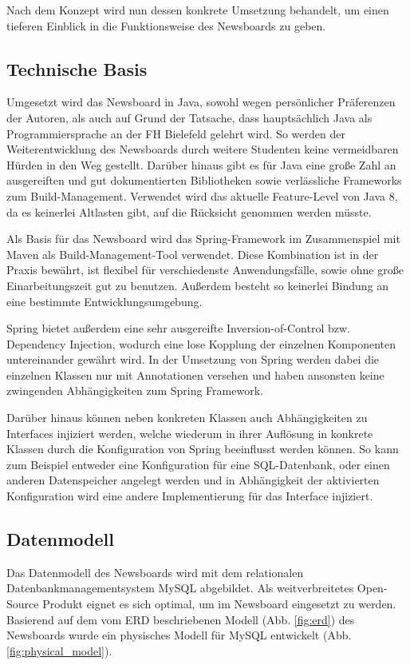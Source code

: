 Nach dem Konzept wird nun dessen konkrete Umsetzung behandelt,
um einen tieferen Einblick in die Funktionsweise des Newsboards zu geben.

\subsection{Technische Basis}
Umgesetzt wird das Newsboard in Java, sowohl wegen persönlicher Präferenzen der Autoren,
als auch auf Grund der Tatsache, dass hauptsächlich Java als Programmiersprache
an der FH Bielefeld gelehrt wird. So werden der Weiterentwicklung des Newsboards
durch weitere Studenten keine vermeidbaren Hürden in den Weg gestellt.
Darüber hinaus gibt es für Java eine große Zahl an ausgereiften
und gut dokumentierten Bibliotheken sowie verlässliche Frameworks zum 
Build-Management. Verwendet wird das aktuelle Feature-Level von Java 8,
da es keinerlei Altlasten gibt, auf die Rücksicht genommen werden müsste.

Als Basis für das Newsboard wird das Spring-Framework im Zusammenspiel mit Maven
als Build-Management-Tool verwendet. Diese Kombination ist in der Praxis bewährt,
ist flexibel für verschiedenste Anwendungsfälle, sowie ohne große Einarbeitungszeit
gut zu benutzen. Außerdem besteht so keinerlei Bindung
an eine bestimmte Entwicklungsumgebung.

Spring bietet außerdem eine sehr ausgereifte Inversion-of-Control bzw.
Dependency Injection, wodurch eine lose Kopplung der einzelnen Komponenten
untereinander gewährt wird\cite{fowler-ioc}.
In der Umsetzung von Spring werden dabei die einzelnen Klassen nur mit
Annotationen versehen und haben ansonsten keine zwingenden Abhängigkeiten
zum Spring Framework.

Darüber hinaus können neben konkreten Klassen auch Abhängigkeiten zu Interfaces
injiziert werden, welche wiederum in ihrer Auflösung in konkrete Klassen
durch die Konfiguration von Spring beeinflusst werden können.
So kann zum Beispiel entweder eine Konfiguration für eine SQL-Datenbank,
oder einen anderen Datenspeicher angelegt werden und in Abhängigkeit
der aktivierten Konfiguration wird eine andere Implementierung für das
Interface injiziert.

\subsection{Datenmodell}
Das Datenmodell des Newsboards wird mit dem relationalen Datenbankmanagementsystem MySQL
abgebildet. Als weitverbreitetes Open-Source Produkt eignet es sich optimal, um im
Newsboard eingesetzt zu werden. Basierend auf dem vom ERD beschriebenen Modell
(Abb. \ref{fig:erd}) des Newsboards wurde ein physisches Modell für MySQL entwickelt
(Abb. \ref{fig:physical_model}).

